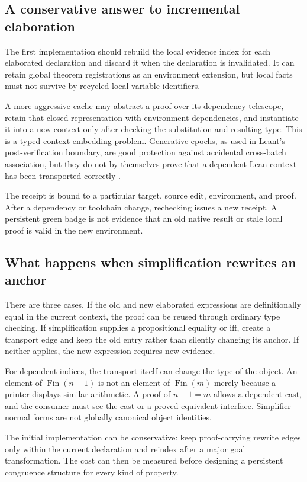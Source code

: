 \documentclass[11pt,a4paper]{article}
\theoremstyle{plain}
\theoremstyle{definition}
\theoremstyle{remark}
\begin{document}
\subsection{A conservative answer to incremental elaboration}
The first implementation should rebuild the local evidence index for each elaborated declaration and discard it when the declaration is invalidated. It can retain global theorem registrations as an environment extension, but local facts must not survive by recycled local-variable identifiers.

A more aggressive cache may abstract a proof over its dependency telescope, retain that closed representation with environment dependencies, and instantiate it into a new context only after checking the substitution and resulting type. This is a typed context embedding problem. Generative epochs, as used in Leant's post-verification boundary, are good protection against accidental cross-batch association, but they do not by themselves prove that a dependent Lean context has been transported correctly \cite{postverification}.

The receipt is bound to a particular target, source edit, environment, and proof. After a dependency or toolchain change, rechecking issues a new receipt. A persistent green badge is not evidence that an old native result or stale local proof is valid in the new environment.

\subsection{What happens when simplification rewrites an anchor}
There are three cases. If the old and new elaborated expressions are definitionally equal in the current context, the proof can be reused through ordinary type checking. If simplification supplies a propositional equality or iff, create a transport edge and keep the old entry rather than silently changing its anchor. If neither applies, the new expression requires new evidence.

For dependent indices, the transport itself can change the type of the object. An element of $\operatorname{Fin}(n+1)$ is not an element of $\operatorname{Fin}(m)$ merely because a printer displays similar arithmetic. A proof of $n+1=m$ allows a dependent cast, and the consumer must see the cast or a proved equivalent interface. Simplifier normal forms are not globally canonical object identities.

The initial implementation can be conservative: keep proof-carrying rewrite edges only within the current declaration and reindex after a major goal transformation. The cost can then be measured before designing a persistent congruence structure for every kind of property.
\end{document}

